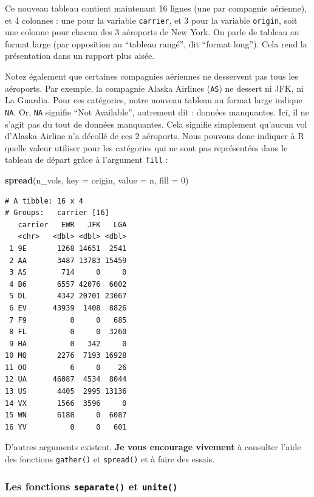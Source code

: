 \documentclass[a4paperpaper,]{article}
\newenvironment{Shaded}{\begin{snugshade}}{\end{snugshade}}
\newcommand{\DataTypeTok}[1]{\textcolor[rgb]{0.00,0.34,0.68}{#1}}
\newcommand{\DecValTok}[1]{\textcolor[rgb]{0.69,0.50,0.00}{#1}}
\newcommand{\KeywordTok}[1]{\textcolor[rgb]{0.12,0.11,0.11}{\textbf{#1}}}
\newcommand{\NormalTok}[1]{\textcolor[rgb]{0.12,0.11,0.11}{#1}}
\begin{document}
Ce nouveau tableau contient maintenant 16 lignes (une par compagnie aérienne), et 4 colonnes : une pour la variable \texttt{carrier}, et 3 pour la variable \texttt{origin}, soit une colonne pour chacun des 3 aéroports de New York. On parle de tableau au format large (par opposition au ``tableau rangé'', dit ``format long''). Cela rend la présentation dans un rapport plus aisée.

Notez également que certaines compagnies aériennes ne desservent pas tous les aéroports. Par exemple, la compagnie Alaska Airlines (\texttt{AS}) ne dessert ni JFK, ni La Guardia. Pour ces catégories, notre nouveau tableau au format large indique \texttt{NA}. Or, \texttt{NA} signifie ``Not Available'', autrement dit : données manquantes. Ici, il ne s'agit pas du tout de données manquantes. Cela signifie simplement qu'aucun vol d'Alaska Airline n'a décollé de ces 2 aéroports. Nous pouvons donc indiquer à R quelle valeur utiliser pour les catégories qui ne sont pas représentées dans le tableau de départ grâce à l'argument \texttt{fill} :

\begin{Shaded}
\begin{Highlighting}[]
\KeywordTok{spread}\NormalTok{(n_vols, }\DataTypeTok{key =}\NormalTok{ origin, }\DataTypeTok{value =}\NormalTok{ n, }\DataTypeTok{fill =} \DecValTok{0}\NormalTok{)}
\end{Highlighting}
\end{Shaded}

\begin{verbatim}
# A tibble: 16 x 4
# Groups:   carrier [16]
   carrier   EWR   JFK   LGA
   <chr>   <dbl> <dbl> <dbl>
 1 9E       1268 14651  2541
 2 AA       3487 13783 15459
 3 AS        714     0     0
 4 B6       6557 42076  6002
 5 DL       4342 20701 23067
 6 EV      43939  1408  8826
 7 F9          0     0   685
 8 FL          0     0  3260
 9 HA          0   342     0
10 MQ       2276  7193 16928
11 OO          6     0    26
12 UA      46087  4534  8044
13 US       4405  2995 13136
14 VX       1566  3596     0
15 WN       6188     0  6087
16 YV          0     0   601
\end{verbatim}

D'autres arguments existent. \textbf{Je vous encourage vivement} à consulter l'aide des fonctions \texttt{gather()} et \texttt{spread()} et à faire des essais.

\hypertarget{les-fonctions-separate-et-unite}{%
\subsubsection{\texorpdfstring{Les fonctions \texttt{separate()} et \texttt{unite()}}{Les fonctions separate() et unite()}}\label{les-fonctions-separate-et-unite}}
\end{document}
